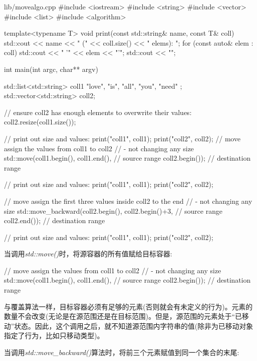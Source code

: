 \begin{codeboxt}[cpp]{lib/movealgo.cpp}
#include <iostream>
#include <string>
#include <vector>
#include <list>
#include <algorithm>

template<typename T>
void print(const std::string& name, const T& coll)
{
  std::cout << name << " (" << coll.size() << " elems): ";
  for (const auto& elem : coll) {
    std::cout << " '" << elem << "'";
  }
  std::cout << "\n";
}

int main(int argc, char** argv)
{
  std::list<std::string> coll1 { "love", "is", "all", "you", "need" };
  std::vector<std::string> coll2;

  // ensure coll2 has enough elements to overwrite their values:
  coll2.resize(coll1.size());

  // print out size and values:
  print("coll1", coll1);
  print("coll2", coll2);
  // move assign the values from coll1 to coll2
  // - not changing any size
  std::move(coll1.begin(), coll1.end(), // source range
  coll2.begin()); // destination range

  // print out size and values:
  print("coll1", coll1);
  print("coll2", coll2);

  // move assign the first three values inside coll2 to the end
  // - not changing any size
  std::move_backward(coll2.begin(), coll2.begin()+3, // source range
  coll2.end()); // destination range

  // print out size and values:
  print("coll1", coll1);
  print("coll2", coll2);
}
\end{codeboxt}

当调用\textit{std::move()}时，将源容器的所有值赋给目标容器:\par

\begin{codebox}[cpp]
// move assign the values from coll1 to coll2
// - not changing any size
std::move(coll1.begin(), coll1.end(), // source range
      coll2.begin()); // destination range
\end{codebox}

与覆盖算法一样，目标容器必须有足够的元素(否则就会有未定义的行为)。元素的数量不会改变(无论是在源范围还是在目标范围)。但是，源范围的元素处于“已移动”状态。因此，这个调用之后，就不知道源范围内字符串的值(除非为已移动对象指定了行为，比如只移动类型)。\par

当调用\textit{std::\allowbreak{}move\_\allowbreak{}backward(\allowbreak{})\allowbreak{}}算法时，将前三个元素赋值到同一个集合的末尾:\par

